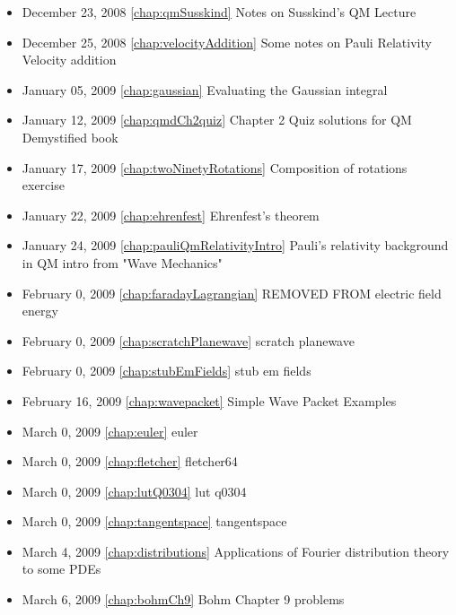 \begin{itemize}
\item December 23, 2008 \ref{chap:qmSusskind} Notes on Susskind's QM Lecture

\item December 25, 2008 \ref{chap:velocityAddition} Some notes on Pauli Relativity Velocity addition

\item January 05, 2009 \ref{chap:gaussian} Evaluating the Gaussian integral

\item January 12, 2009 \ref{chap:qmdCh2quiz} Chapter 2 Quiz solutions for QM Demystified book

\item January 17, 2009 \ref{chap:twoNinetyRotations} Composition of rotations exercise

\item January 22, 2009 \ref{chap:ehrenfest} Ehrenfest's theorem

\item January 24, 2009 \ref{chap:pauliQmRelativityIntro} Pauli's relativity background in QM intro from "Wave Mechanics"

\item February 0, 2009 \ref{chap:faradayLagrangian} REMOVED FROM electric field energy

\item February 0, 2009 \ref{chap:scratchPlanewave} scratch planewave

\item February 0, 2009 \ref{chap:stubEmFields} stub em fields

\item February 16, 2009 \ref{chap:wavepacket} Simple Wave Packet Examples

\item March 0, 2009 \ref{chap:euler} euler

\item March 0, 2009 \ref{chap:fletcher} fletcher64

\item March 0, 2009 \ref{chap:lutQ0304} lut q0304

\item March 0, 2009 \ref{chap:tangentspace} tangentspace

\item March 4, 2009 \ref{chap:distributions} Applications of Fourier distribution theory to some PDEs

\item March 6, 2009 \ref{chap:bohmCh9} Bohm Chapter 9 problems


\end{itemize}
